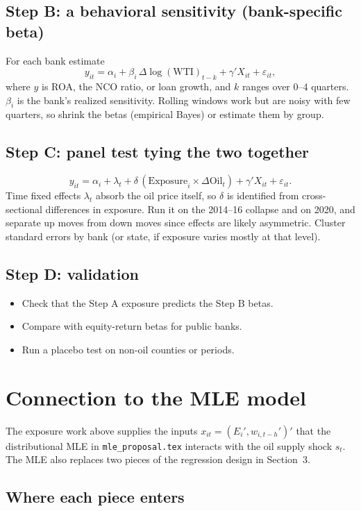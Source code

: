 \documentclass[11pt]{article}
\begin{document}
\subsection*{Step B: a behavioral sensitivity (bank-specific beta)}
For each bank estimate
\[
  y_{it} = \alpha_i + \beta_i\,\Delta\log(\text{WTI})_{t-k} + \gamma' X_{it} + \varepsilon_{it},
\]
where $y$ is ROA, the NCO ratio, or loan growth, and $k$ ranges over 0--4 quarters. $\beta_i$ is the bank's realized sensitivity. Rolling windows work but are noisy with few quarters, so shrink the betas (empirical Bayes) or estimate them by group.

\subsection*{Step C: panel test tying the two together}
\[
  y_{it} = \alpha_i + \lambda_t + \delta\,(\text{Exposure}_i\times \Delta\text{Oil}_t) + \gamma' X_{it} + \varepsilon_{it}.
\]
Time fixed effects $\lambda_t$ absorb the oil price itself, so $\delta$ is identified from cross-sectional differences in exposure. Run it on the 2014--16 collapse and on 2020, and separate up moves from down moves since effects are likely asymmetric. Cluster standard errors by bank (or state, if exposure varies mostly at that level).

\subsection*{Step D: validation}
\begin{itemize}
  \item Check that the Step A exposure predicts the Step B betas.
  \item Compare with equity-return betas for public banks.
  \item Run a placebo test on non-oil counties or periods.
\end{itemize}

\section{Connection to the MLE model}

The exposure work above supplies the inputs $x_{it}=(E_i',w_{i,t-h}')'$ that the distributional MLE in \texttt{mle\_proposal.tex} interacts with the oil supply shock $s_t$. The MLE also replaces two pieces of the regression design in Section~3.

\subsection*{Where each piece enters}
\end{document}
